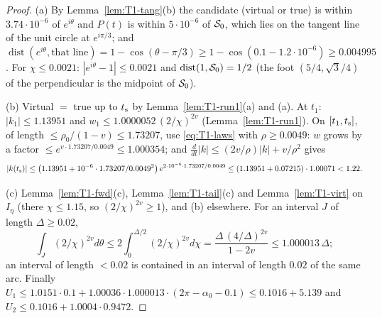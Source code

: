 \begin{proof}
(a) By Lemma~\ref{lem:T1-tang}(b) the candidate (virtual or true) is within $3.74\cdot10^{-6}$ of $e^{i\theta}$ and $P(t)$ is within
$5\cdot10^{-6}$ of $\mathcal S_0$, which lies on the tangent line of the unit circle at $e^{i\pi/3}$; and
$\operatorname{dist}(e^{i\theta},\text{that line})=1-\cos(\theta-\pi/3)\ge1-\cos(0.1-1.2\cdot10^{-6})\ge0.004995$. For
$\chi\le0.0021$: $|e^{i\theta}-1|\le0.0021$ and $\operatorname{dist}(1,\mathcal S_0)=1/2$ (the foot $(5/4,\sqrt3/4)$ of the perpendicular is
the midpoint of $\mathcal S_0$).

(b) Virtual $=$ true up to $t_{\mathrm s}$ by Lemma~\ref{lem:T1-run1}(a) and (a). At $t_1$: $|k_1|\le1.13951$ and
$w_1\le1.0000052\,(2/\chi)^{2v}$ (Lemma~\ref{lem:T1-run1}). On $[t_1,t_{\mathrm s}]$, of length $\le\rho_0/(1-v)\le1.73207$, use
\eqref{eq:T1-laws} with $\rho\ge0.0049$: $w$ grows by a factor $\le e^{v\cdot1.73207/0.0049}\le1.000354$; and
$\frac d{dt}|k|\le(2v/\rho)|k|+v/\rho^2$ gives
\[
|k(t_{\mathrm s})|\le\bigl(1.13951+10^{-6}\cdot1.73207/0.0049^2\bigr)\,e^{2\cdot10^{-6}\cdot1.73207/0.0049}\le(1.13951+0.07215)\cdot1.00071<1.22 .
\]

(c) Lemma~\ref{lem:T1-fwd}(c), Lemma~\ref{lem:T1-tail}(c) and Lemma~\ref{lem:T1-virt} on $I_\eta$ (there $\chi\le1.15$, so
$(2/\chi)^{2v}\ge1$), and (b) elsewhere. For an interval $J$ of length $\Delta\ge0.02$,
\[
\int_J(2/\chi)^{2v}d\theta\le2\int_0^{\Delta/2}(2/\chi)^{2v}d\chi=\frac{\Delta\,(4/\Delta)^{2v}}{1-2v}\le1.000013\,\Delta ;
\]
an interval of length $<0.02$ is contained in an interval of length $0.02$ of the same arc. Finally
$U_1\le1.0151\cdot0.1+1.00036\cdot1.000013\cdot(2\pi-\alpha_0-0.1)\le0.1016+5.139$ and $U_2\le0.1016+1.0004\cdot0.9472$.
\end{proof}

